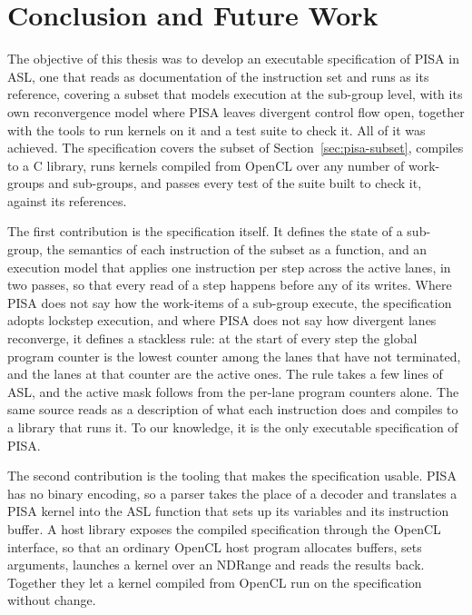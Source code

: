 
\chapter{Conclusion and Future Work}
\label{chap:conclusion}

The objective of this thesis was to develop an executable specification
of PISA in ASL, one that reads as documentation of the instruction set
and runs as its reference, covering a subset that models execution at
the sub-group level, with its own reconvergence model where PISA leaves
divergent control flow open, together with the tools to run kernels on
it and a test suite to check it. All of it was achieved. The
specification covers the subset of Section~\ref{sec:pisa-subset},
compiles to a C library, runs kernels compiled from OpenCL over any
number of work-groups and sub-groups, and passes every test of the
suite built to check it, against its references.

The first contribution is the specification itself. It defines the
state of a sub-group, the semantics of each instruction of the subset
as a function, and an execution model that applies one instruction per
step across the active lanes, in two passes, so that every read of a
step happens before any of its writes. Where PISA does not say how the
work-items of a sub-group execute, the specification adopts lockstep
execution, and where PISA does not say how divergent lanes reconverge,
it defines a stackless rule: at the start of every step the global
program counter is the lowest counter among the lanes that have not
terminated, and the lanes at that counter are the active ones. The rule
takes a few lines of ASL, and the active mask follows from the per-lane
program counters alone. The same source reads as a description of what
each instruction does and compiles to a library that runs it. To our
knowledge, it is the only executable specification of PISA.

The second contribution is the tooling that makes the specification
usable. PISA has no binary encoding, so a parser takes the place of a
decoder and translates a PISA kernel into the ASL function that sets up
its variables and its instruction buffer. A host library exposes the
compiled specification through the OpenCL interface, so that an
ordinary OpenCL host program allocates buffers, sets arguments,
launches a kernel over an NDRange and reads the results back. Together
they let a kernel compiled from OpenCL run on the specification without
change.

